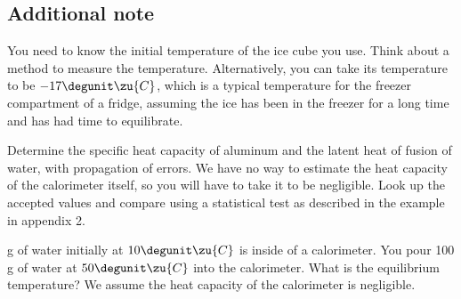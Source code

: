 \subsection*{Additional note}
You need to know the initial temperature of the ice cube you
use. Think about a method to measure the temperature.  Alternatively,
you can take its temperature to be $-17\degunit\zu{C}$, which is a
typical temperature for the freezer compartment of a fridge, assuming
the ice has been in the freezer for a long time and has had time to
equilibrate.


\analysis

Determine the specific heat capacity of aluminum and the latent heat of fusion of water,
with propagation of errors.
We have no way to estimate the heat capacity of the calorimeter itself, so you will have
to take it to be negligible. Look up the accepted values and
compare
using a statistical test as described in the example in appendix 2.

\prelab

 g of water initially at $10\degunit\zu{C}$ is inside of a calorimeter. You pour 100 g of water at $50\degunit\zu{C}$ into the calorimeter. What is the equilibrium temperature? We assume the heat capacity of the calorimeter is negligible. 

